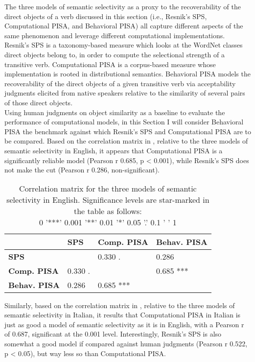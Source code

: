 The three models of semantic selectivity as a proxy to the recoverability of the direct objects of a verb discussed in this section (i.e., Resnik's SPS, Computational PISA, and Behavioral PISA) all capture different aspects of the same phenomenon and leverage different computational implementations. Resnik's SPS is a taxonomy-based measure which looks at the WordNet classes direct objects belong to, in order to compute the selectional strength of a transitive verb. Computational PISA is a corpus-based measure whose implementation is rooted in distributional semantics. Behavioral PISA models the recoverability of the direct objects of a given transitive verb via acceptability judgments elicited from native speakers relative to the similarity of several pairs of those direct objects.\\
Using human judgments on object similarity as a baseline to evaluate the performance of computational models, in this Section I will consider Behavioral PISA the benchmark against which Resnik's SPS and Computational PISA are to be compared. Based on the correlation matrix in , relative to the three models of semantic selectivity in English, it appears that Computational PISA is a significantly reliable model (Pearson r 0.685, p < 0.001), while Resnik's SPS does not make the cut (Pearson r 0.286, non-significant).

\begin{table}[htb] %
\caption{Correlation matrix for the three models of semantic selectivity in English. Significance levels are star-marked in the table as follows:\\ 0 '***'  0.001 '**' 0.01 '*' 0.05 '.' 0.1 ' ' 1}
\begin{tabular}{l|lll}
      & \textbf{SPS}   & \textbf{Comp. PISA}    & \textbf{Behav. PISA}    \\
\hline
\textbf{SPS}   &       & 0.330 .     & 0.286    \\
\textbf{Comp. PISA} & 0.330 .  &          & 0.685 *** \\
\textbf{Behav. PISA} & 0.286 & 0.685 *** &     
\end{tabular}
\end{table}

Similarly, based on the correlation matrix in , relative to the three models of semantic selectivity in Italian, it results that Computational PISA in Italian is just as good a model of semantic selectivity as it is in English, with a Pearson r of 0.687, significant at the 0.001 level. Interestingly, Resnik's SPS is also somewhat a good model if compared against human judgments (Pearson r 0.522, p < 0.05), but way less so than Computational PISA.

